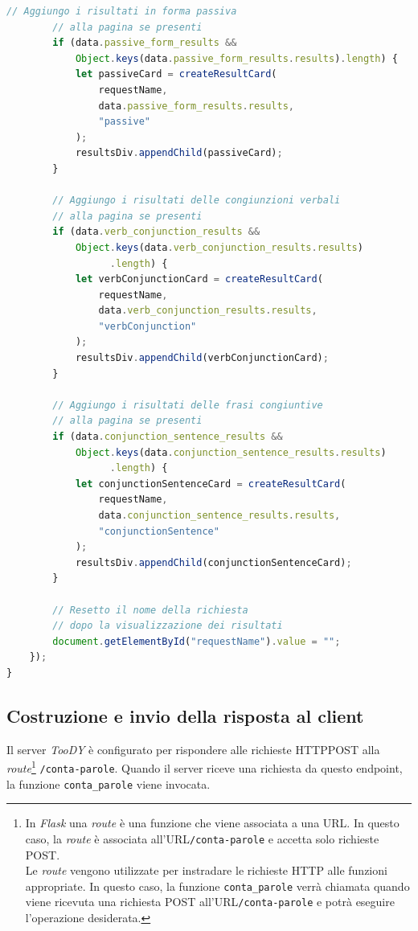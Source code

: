 \documentclass[12pt]{report}
\newcommand{\toody}{\textsl{TooDY}\xspace}
\newcommand{\flask}{\textsl{Flask}\xspace}
\newcommand{\URL}{\textsf{URL}\xspace}
\newcommand{\http}{\textsf{HTTP}\xspace}
\newcommand{\post}{\textsf{POST}\xspace}
\begin{document}
\begin{lstlisting}[language=JavaScript]
        // Aggiungo i risultati in forma passiva
        // alla pagina se presenti
        if (data.passive_form_results &&
            Object.keys(data.passive_form_results.results).length) {
            let passiveCard = createResultCard(
                requestName,
                data.passive_form_results.results,
                "passive"
            );
            resultsDiv.appendChild(passiveCard);
        }

        // Aggiungo i risultati delle congiunzioni verbali
        // alla pagina se presenti
        if (data.verb_conjunction_results &&
            Object.keys(data.verb_conjunction_results.results)
                  .length) {
            let verbConjunctionCard = createResultCard(
                requestName,
                data.verb_conjunction_results.results,
                "verbConjunction"
            );
            resultsDiv.appendChild(verbConjunctionCard);
        }

        // Aggiungo i risultati delle frasi congiuntive
        // alla pagina se presenti
        if (data.conjunction_sentence_results &&
            Object.keys(data.conjunction_sentence_results.results)
                  .length) {
            let conjunctionSentenceCard = createResultCard(
                requestName,
                data.conjunction_sentence_results.results,
                "conjunctionSentence"
            );
            resultsDiv.appendChild(conjunctionSentenceCard);
        }

        // Resetto il nome della richiesta
        // dopo la visualizzazione dei risultati
        document.getElementById("requestName").value = "";
    });
}
\end{lstlisting}




\subsection{Costruzione e invio della risposta al client}
Il server \toody è configurato per rispondere alle richieste \http \post alla \textit{route}\footnote{In \flask una \textit{route} è una funzione che viene associata a una \URL. In questo caso, la \textit{route} è associata all'\URL \texttt{/conta-parole} e accetta solo richieste \post.\\
Le \textit{route} vengono utilizzate per instradare le richieste \http alle funzioni appropriate. In questo caso, la funzione \texttt{conta\_parole} verrà chiamata quando viene ricevuta una richiesta \post all'\URL \texttt{/conta-parole} e potrà eseguire l'operazione desiderata.} \texttt{/conta-parole}. Quando il server riceve una richiesta da questo endpoint, la funzione \texttt{conta\_parole} viene invocata.
\end{document}
